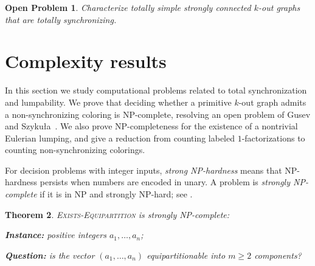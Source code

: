 \documentclass[a4paper,10pt]{amsart}
\theoremstyle{plain}
\newtheorem{theorem}{Theorem}[section]
\newtheorem{open}[theorem]{Open Problem}
\theoremstyle{definition}
\begin{document}
\begin{open}\label{open:char-tot-simple-tot-sync}
Characterize totally simple strongly connected $k$-out graphs that are totally synchronizing.
\end{open}
\section{Complexity results}\label{sec: complexity}
In this section we study computational problems related to total synchronization and lumpability.
We prove that deciding whether a primitive $k$-out graph admits a non-synchronizing coloring is NP-complete, resolving an open problem of Gusev and Szyku{\l}a~\cite[Problem~1]{GusevSzykula15}.
We also prove NP-completeness for the existence of a nontrivial Eulerian lumping, and give a reduction from counting labeled $1$-factorizations to counting non-synchronizing colorings.

For decision problems with integer inputs, \emph{strong NP-hardness} means that NP-hardness persists when numbers are encoded in unary.
A problem is \emph{strongly NP-complete} if it is in NP and strongly NP-hard; see \cite[Ch.~4]{GareyJohnson}.
\begin{theorem}\label{thm:exists-m-strong-npc}
\textsc{Exists-Equipartition} is strongly NP-complete:

\medskip
\noindent\textbf{Instance:} positive integers $a_1,\dots,a_n$;

\noindent\textbf{Question:} is the vector $(a_1,\ldots, a_n)$ equipartitionable into $m\ge 2$ components?
\end{theorem}
\end{document}

